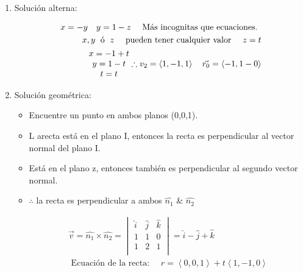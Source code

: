 \begin{enumerate}
    \item Solución alterna:
        \begin{center}
            \begin{align*}
                x = -y \quad y = 1-z \quad \text{  Más incognitas que ecuaciones.  }\\
                x,y \; \text{  ó   }\; z \text{  \quad pueden tener cualquier valor  } \quad z=t \\ 
                \begin{matrix}
                    x = -1 + t \\ 
                    y = 1 - t \\ 
                    t = t \\ 
                \end{matrix} \therefore v_2 = \left\langle 1,-1,1 \right\rangle  \quad \vec{r_0} = \left\langle -1,1-0 \right\rangle \\ 
            \end{align*}
        \end{center}
    
    \item Solución geométrica:
        \begin{itemize}
            \item Encuentre un punto en ambos planos (0,0,1).
            \item L arecta está en el plano I, entonces la recta es perpendicular al vector normal del plano I.
            \item Está en el plano z, entonces también es perpendicular al segundo vector normal.
            \item $\therefore $ la recta es perpendicular a ambos $\hat{n_1}$ \& $\hat{n_2}$
                \begin{center}
                    \begin{align*}
                        \vec{v} = \hat{n_1} \times \hat{n_2} = \begin{vmatrix}
                            \hat{i} & \hat{j} & \hat{k} \\ 
                            1 & 1 & 0 \\ 
                            1 & 2 & 1 \\ 
                        \end{vmatrix} = \hat{i} - \hat{j} + \hat{k} \\ 
                        \text{  Ecuación de la recta:  } \quad r = \left\langle 0,0,1 \right\rangle + t \left\langle 1,-1,0 \right\rangle \\ 
                    \end{align*}
                \end{center}
        \end{itemize}
    

\end{enumerate}
